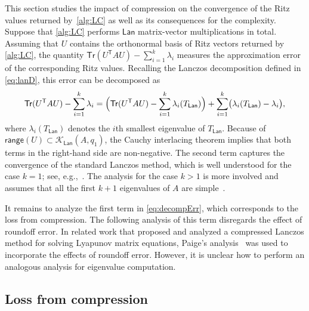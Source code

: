 \documentclass{siamart190516}
\newcommand{\Ttran}{\mathsf{T}}
\newcommand{\Tr}{\mathsf{Tr}}
\newcommand{\lan}{\mathsf{Lan}}
\newcommand{\range}{\mathsf{range}}
\begin{document}
This section studies the impact of compression on the convergence of the Ritz values returned by~\cref{alg:LC} as well as its consequences for the complexity. 
Suppose that \cref{alg:LC} performs $\lan$ matrix-vector multiplications in total. 
Assuming that $U$ contains the orthonormal basis of Ritz vectors returned by \cref{alg:LC}, the quantity $\Tr(U^{\Ttran}AU)-\sum_{i=1}^{k}\lambda_{i}$ measures the approximation error of the corresponding Ritz values. Recalling the Lanczos decomposition defined in \cref{eq:lanD}, this error can be decomposed as 
\begin{equation}
    \label{eq:decompErr}
    \Tr(U^{\Ttran}AU)-\sum_{i=1}^{k}\lambda_{i} = \Bigl(\Tr(U^{\Ttran}AU)-\sum_{i=1}^{k}\lambda_{i}(T_{\lan})\Bigr)
    +\sum_{i=1}^{k}\bigl(\lambda_{i}(T_{\lan})-\lambda_{i}\bigr),
\end{equation} 
where  $\lambda_{i}(T_{\lan})$ denotes the $i$th smallest eigenvalue of $T_{\lan}$.
Because of $\range (U)\subset \mathcal{K}_{\lan}(A,q_{1})$, the Cauchy interlacing theorem implies that both terms in the right-hand side are non-negative.
The second term captures the convergence of the standard Lanczos method, which is well understood for the case $k = 1$; see, e.g.,~\cite{Saad1980, Parlett1998}. The analysis for the case $k > 1$
is more involved and assumes that all the first $k+1$ eigenvalues of $A$ are simple~\cite{kressner2024randomized}.

It remains to analyze the first term in \cref{eq:decompErr}, which corresponds to the loss from compression. 
The following analysis of this term disregards the effect of roundoff error.
In related work \cite{casulli2025lanczos} that proposed and analyzed a compressed Lanczos method for solving Lyapunov matrix equations, Paige's analysis~\cite{Paige1980} was used to incorporate the effects of roundoff error. However, it is unclear how to perform an analogous analysis  for eigenvalue computation.

\subsection{Loss from compression}
\end{document}
